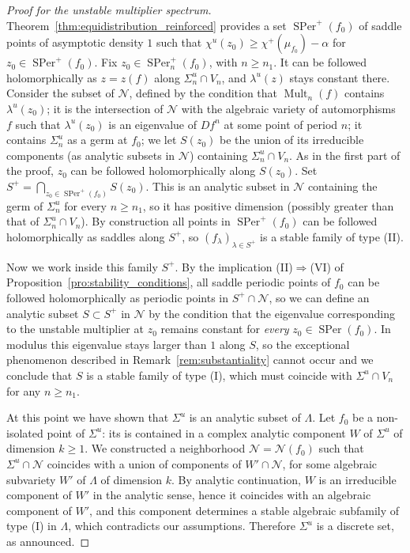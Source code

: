 \documentclass[oneside, 12pt]{amsart}
\DeclareMathOperator{\SPer}{SPer}
\DeclareMathOperator{\Mult}{Mult}
\theoremstyle{plain}
\theoremstyle{definition}
\numberwithin{equation}{section}       %
\numberwithin{equation}{section}       %
\begin{document}
\begin{proof}[Proof for the unstable  multiplier spectrum]
Theorem~\ref{thm:equidistribution_reinforced} provides a set $\SPer^+(f_0)$ of saddle points  of asymptotic density $1$  
such that $\chi^u(z_0)\geq \chi^+(\mu_{f_0}) - \alpha$ for    $z_0\in \SPer^+(f_0)$. 
Fix   $z_0\in \SPer^+_n(f_0)$, with $n\geq n_1$. It can be followed holomorphically as $z =z(f)$ along $\Sigma^u_n\cap V_n$, 
and $\lambda^u(z)$ stays constant there. 
Consider the subset of $\mathcal N$,  defined by the condition that  $\Mult_n(f)$  contains $\lambda^u(z_0)$; 
it is the intersection of $\mathcal N$ with the algebraic variety of automorphisms $f$ such that $\lambda^u(z_0)$
is an eigenvalue of $Df^n$ at some point of period $n$;
it contains $\Sigma^u_n$ as a germ at $f_0$;  
we let   $S(z_0)$ be the union of its irreducible
  components (as analytic subsets in $\mathcal N$)
containing $\Sigma^u_n\cap V_n$. 
As in the first part of the proof, $z_0$ can be followed holomorphically along   
$S(z_0)$. Set $S^+  = \bigcap_{z_0\in \SPer^+(f_0)} S(z_0)$. This is an 
analytic subset
 in $\mathcal N$ containing the germ of $\Sigma^u_n$ for every $n\geq n_1$, so 
it has positive dimension (possibly greater than that of  $\Sigma_n^u\cap V_n$). By construction all points in $\SPer^+(f_0)$ can be followed holomorphically as saddles 
along $S^+$, so $(f_\lambda)_{\lambda\in S^+}$ is a stable family of type (II). 

Now we work inside this family $S^+$. By the implication (II)$\Rightarrow$(VI) of 
Proposition~\ref{pro:stability_conditions}, all saddle periodic points of $f_0$ 
can be followed holomorphically as periodic points 
in $S^+\cap \mathcal N$, so we can define  
an analytic subset $S\subset S^+$ in $\mathcal N$
 by the condition that the eigenvalue corresponding to the unstable multiplier at $z_0$ remains constant for \emph{every} $z_0\in \SPer(f_0)$. 
In modulus this eigenvalue stays larger than $1$ along $S$, so the exceptional phenomenon described in  
Remark~\ref{rem:substantiality} cannot occur and we conclude that $S$ is a stable family of type (I), which must coincide with $\Sigma^u\cap V_n$ for any $n\geq n_1$. 
 
 
At this point  we have shown that $\Sigma^u$ is an analytic subset of $\Lambda$. 
Let $f_0$ be a non-isolated point of $\Sigma^u$: its is contained in a complex analytic  component $W$ of $\Sigma^u$ of dimension $k\geq 1$. 
We constructed a neighborhood $\mathcal N  = \mathcal N(f_0)$ such that 
$\Sigma^u\cap \mathcal N$ coincides with a union of components of $W'\cap \mathcal N$, for some algebraic subvariety $W'$ of $\Lambda$ of dimension $k$. 
By analytic continuation, $W$ is an irreducible component of $W'$ in the analytic sense, hence it coincides with an algebraic component of $W'$, and this component determines
a stable algebraic subfamily of type (I) in $\Lambda$, which  contradicts our assumptions.  
Therefore $\Sigma^u$ is a discrete set, as announced. 
\end{proof}
\end{document}

